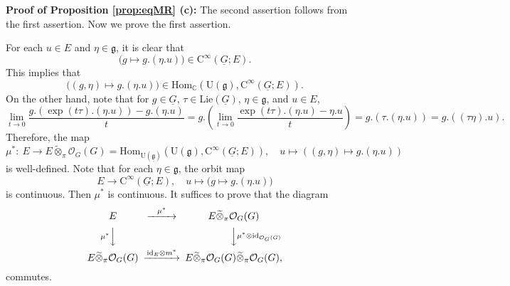 \documentclass[12pt, a4paper]{amsart}
\newcommand{\BC}{{\mathbb {C}}}
\newcommand{\CO}{{\mathcal {O}}}
\newcommand{\RC}{{\mathrm {C}}}
\newcommand{\RU}{{\mathrm {U}}}
\newcommand{\Hom}{{\mathrm{Hom}}}
\newcommand{\Lie}{{\mathrm{Lie}}}
\newcommand{\wt}{\widetilde}
\newcommand{\g}{\mathfrak g}
\newcommand{\be}{\begin {equation}}
\newcommand{\ee}{\end {equation}}
\theoremstyle{Theorem}
\theoremstyle{Theorem}
\theoremstyle{Theorem}
\theoremstyle{Theorem}
\theoremstyle{Plain}
\theoremstyle{remark}
\theoremstyle{remark}
\theoremstyle{Definition}
\numberwithin{equation}{section}
\begin{document}
\vspace{3mm}


\noindent\textbf{Proof of Proposition \ref{prop:eqMR} (c):} %
 The second assertion follows from the first assertion. Now we prove the first assertion. 

For each $u\in E$ and $\eta \in \g$, it is clear that 
\[\big(g\mapsto g.(\eta.u)\big)\in \RC^{\infty}(\underline G;E).\] 
This implies that 
\[\big((g,\eta)\mapsto g.(\eta.u)\big)\in \Hom_{\BC}(\RU(\g),\RC^{\infty}(\underline G;E)). \]
On the other hand, note that for $g\in \underline{G}$,  $\tau\in \Lie(\underline{G})$, $\eta\in \g$, and $u\in E$,
\[\lim_{t\rightarrow 0}\frac{g.(\exp(t\tau).(\eta.u))-g.(\eta.u)}{t}=g.( \lim_{t\rightarrow 0}\frac{\exp(t\tau).(\eta.u)-\eta.u}{t})=g.(\tau.(\eta.u))= g.((\tau\eta).u).\] Therefore, the map 
     \[\mu^*:\ E \longrightarrow E \wt{\otimes}_{\pi}\mathcal{O}_G(G)=\Hom_{\RU(\underline{\g})}(\RU(\g),\RC^{\infty}(\underline G;E)),\quad u\mapsto ((g,\eta)\mapsto g.(\eta.u))
    \] is well-defined. Note that for each $\eta\in \g$,  the orbit map \[E\rightarrow \RC^{\infty}(\underline G;E),\quad u\mapsto \big(g\mapsto g.(\eta.u)\big)\] is continuous.
     Then $\mu^*$ is continuous. %
     It suffices to prove that the diagram 
\be\label{eq:diafortoEO}\begin{CD}
E @>  \mu^*>>  E\wt\otimes_{\pi} \CO_G(G)\\
	@V\mu^* VV           @V V \mu^* \otimes \mathrm{id}_{\CO_G(G)} V\\
		E\wt\otimes_{\pi}\CO_G(G) @>\mathrm{id}_{E}\otimes m^*>> E\wt\otimes_{\pi} \CO_G(G)\wt\otimes_{\pi}\CO_G(G),
\end{CD} \ee commutes.%
\end{document}
